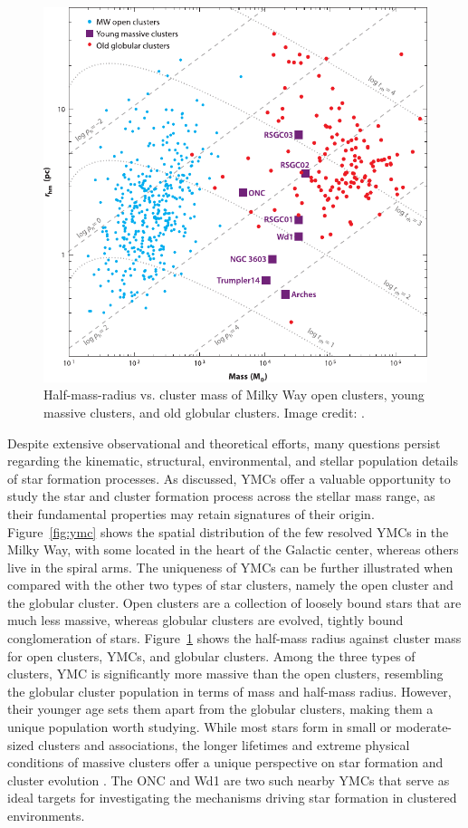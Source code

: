 \documentclass[12pt]{ucsddissertation}
\begin{document}
\begin{CJK*}{UTF8}{gbsn}
\begin{figure}[htb!]
    \centering
    \includegraphics[width=0.7\linewidth]{figures/intro/rhm-mass.pdf}
    \caption[Half-mass-radius vs. cluster mass]{Half-mass-radius vs. cluster mass of Milky Way open clusters, young massive clusters, and old globular clusters. Image credit: \citet{PortegiesZwart-2010}.}
    \label{fig:rhm-mass}
\end{figure}

Despite extensive observational and theoretical efforts, many questions persist regarding the kinematic, structural, environmental, and stellar population details of star formation processes. As discussed, YMCs offer a valuable opportunity to study the star and cluster formation process across the stellar mass range, as their fundamental properties may retain signatures of their origin. Figure~\ref{fig:ymc} shows the spatial distribution of the few resolved YMCs in the Milky Way, with some located in the heart of the Galactic center, whereas others live in the spiral arms. The uniqueness of YMCs can be further illustrated when compared with the other two types of star clusters, namely the open cluster and the globular cluster. Open clusters are a collection of loosely bound stars that are much less massive, whereas globular clusters are evolved, tightly bound conglomeration of stars. Figure~\ref{fig:rhm-mass} shows the half-mass radius against cluster mass for open clusters, YMCs, and globular clusters. Among the three types of clusters, YMC is significantly more massive than the open clusters, resembling the globular cluster population in terms of mass and half-mass radius. However, their younger age sets them apart from the globular clusters, making them a unique population worth studying. While most stars form in small or moderate-sized clusters and associations, the longer lifetimes and extreme physical conditions of massive clusters offer a unique perspective on star formation and cluster evolution \citep[][]{Lada-2003, Bressert-2010, PortegiesZwart-2010, Krumholz-2019}. The ONC and Wd1 are two such nearby YMCs that serve as ideal targets for investigating the mechanisms driving star formation in clustered environments. 



\end{CJK*}
\end{document}
